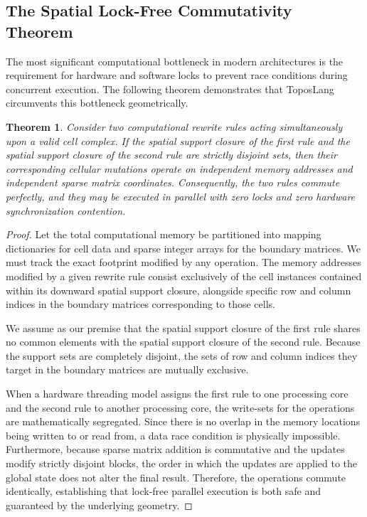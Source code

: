 \documentclass[11pt, a4paper]{article}
\newtheorem{theorem}{Theorem}[section]
\begin{document}
\subsection{The Spatial Lock-Free Commutativity Theorem}
The most significant computational bottleneck in modern architectures is the requirement for hardware and software locks to prevent race conditions during concurrent execution. The following theorem demonstrates that ToposLang circumvents this bottleneck geometrically.

\begin{theorem}
Consider two computational rewrite rules acting simultaneously upon a valid cell complex. If the spatial support closure of the first rule and the spatial support closure of the second rule are strictly disjoint sets, then their corresponding cellular mutations operate on independent memory addresses and independent sparse matrix coordinates. Consequently, the two rules commute perfectly, and they may be executed in parallel with zero locks and zero hardware synchronization contention.
\end{theorem}

\begin{proof}
Let the total computational memory be partitioned into mapping dictionaries for cell data and sparse integer arrays for the boundary matrices. We must track the exact footprint modified by any operation. The memory addresses modified by a given rewrite rule consist exclusively of the cell instances contained within its downward spatial support closure, alongside specific row and column indices in the boundary matrices corresponding to those cells.

We assume as our premise that the spatial support closure of the first rule shares no common elements with the spatial support closure of the second rule. Because the support sets are completely disjoint, the sets of row and column indices they target in the boundary matrices are mutually exclusive. 

When a hardware threading model assigns the first rule to one processing core and the second rule to another processing core, the write-sets for the operations are mathematically segregated. Since there is no overlap in the memory locations being written to or read from, a data race condition is physically impossible. Furthermore, because sparse matrix addition is commutative and the updates modify strictly disjoint blocks, the order in which the updates are applied to the global state does not alter the final result. Therefore, the operations commute identically, establishing that lock-free parallel execution is both safe and guaranteed by the underlying geometry.
\end{proof}
\end{document}
